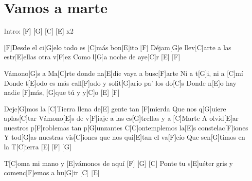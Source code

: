 \section{Vamos a marte}

%
\vspace{1cm}

\begin{guitar}
	\begin{multicols}{2}
	
		Intro: \hspace{0.5cm} [F] \hspace{0.5cm}[G] \hspace{0.5cm} [C] \hspace{0.5cm} [E] \hspace{0.3cm} x2
		
		\newline
	
		[F]Desde el ci[G]elo todo es [C]más bon[E]ito \hspace{0.2cm} [F] \vspace{0.1cm}
		Déjam[G]e llev[C]arte a las estr[E]ellas otra v[F]ez
		Como l[G]a noche de aye[C]r \hspace{0.5cm} [E] \hspace{0.5cm} [F]
		
		\newline
		Vámono[G]s a Ma[C]rte donde na[E]die vaya a busc[F]arte
		Ni a t[G]i, ni a [C]mí
		Donde t[E]odo es más call[F]ado y solit[G]ario pa' los do[C]s
		Donde n[E]o hay nadie [F]más, [G]que tú y y[C]o \hspace{0.5cm} [E] \hspace{0.5cm} [F] 
		
		\newline
		Deje[G]mos la [C]Tierra llena de[E] gente tan [F]mierda
		Que nos q[G]uiere aplas[C]tar
		Vámono[E]s de v[F]iaje a las es[G]trellas y a [C]Marte
		A olvid[E]ar nuestros p[F]roblemas tan p[G]unzantes
		C[C]ontemplemos la[E]s constelac[F]iones
		Y tod[G]as nuestras vis[C]iones que nos qui[E]tan el va[F]cío
		Que sen[G]timos en la T[C]ierra \hspace{0.5cm} [E] \hspace{0.5cm} [F] \hspace{0.5cm} [G]

		\newline		
		T[C]oma mi mano y [E]vámonos de aquí \hspace{0.1cm} [F] \hspace{0.5cm} [G] \hspace{0.5cm} [C] \vspace{0.1cm}
		Ponte tu s[E]uéter gris y comenc[F]emos a hu[G]ir \hspace{0.1cm} [C] \hspace{0.5cm} [E]
		

\end{multicols}
\end{guitar}
